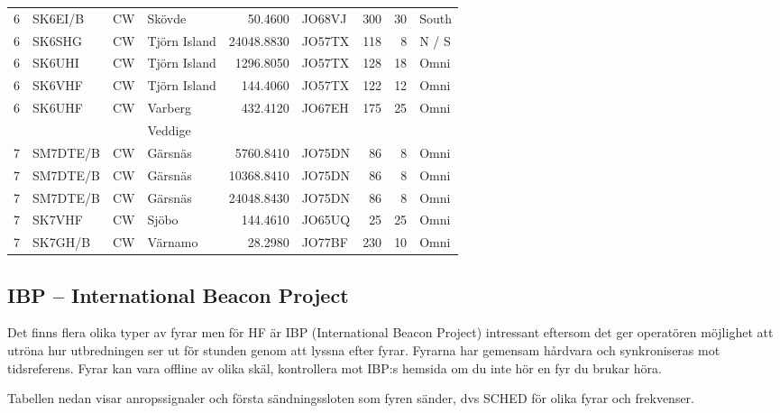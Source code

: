 \begin{longtable}{rlllrlrrl}
	       6 & SK6EI/B    & CW       & Skövde       &      50.4600 & JO68VJ      &      300 &       30 & South        \\
	       6 & SK6SHG     & CW       & Tjörn Island &   24048.8830 & JO57TX      &      118 &        8 & N / S        \\
	       6 & SK6UHI     & CW       & Tjörn Island &    1296.8050 & JO57TX      &      128 &       18 & Omni         \\
	       6 & SK6VHF     & CW       & Tjörn Island &     144.4060 & JO57TX      &      122 &       12 & Omni         \\
	       6 & SK6UHF     & CW       & Varberg      &     432.4120 & JO67EH      &      175 &       25 & Omni         \\
	         &            &          & Veddige      &              &             &          &          &              \\
	       7 & SM7DTE/B   & CW       & Gärsnäs      &    5760.8410 & JO75DN      &       86 &        8 & Omni         \\
	       7 & SM7DTE/B   & CW       & Gärsnäs      &   10368.8410 & JO75DN      &       86 &        8 & Omni         \\
	       7 & SM7DTE/B   & CW       & Gärsnäs      &   24048.8430 & JO75DN      &       86 &        8 & Omni         \\
	       7 & SK7VHF     & CW       & Sjöbo        &     144.4610 & JO65UQ      &       25 &       25 & Omni         \\
	       7 & SK7GH/B    & CW       & Värnamo      &      28.2980 & JO77BF      &      230 &       10 & Omni
\end{longtable}
\normalsize
\clearpage

\subsection{IBP -- International Beacon Project}

Det finns flera olika typer av fyrar men för HF är IBP (International Beacon
Project) intressant eftersom det ger operatören möjlighet att utröna hur
utbredningen ser ut för stunden genom att lyssna efter fyrar. Fyrarna har
gemensam hårdvara och synkroniseras mot tidsreferens. Fyrar kan vara offline
av olika skäl, kontrollera mot IBP:s hemsida om du inte hör en fyr du brukar
höra.

Tabellen nedan visar anropssignaler och första sändningssloten som fyren
sänder, dvs SCHED för olika fyrar och frekvenser.

